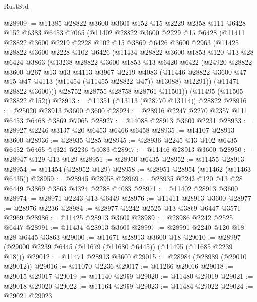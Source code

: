 \begin{lexlean}{RustStd}
\begin{coremodule}
@28909 := @11385
    @28822
    @3600
    @3600
    @152
    @15
    @2229
    @2358
    @111
    @6428
    @152
    @6383
    @6453
    @7065
    (@11402
      @28822
      @3600
      @2229
      @15
      @6428
      (@11411
        @28822
        @3600
        @2219
        @2228
        @102
        @15
        @3869
        @6426
        @3600
        @2963
        (@11425
          @28822
          @3600
          @2228
          @102
          @6426
          (@11434
            @28822
            @3600
            @1853
            @120
            @13
            @28
            @6424
            @3863
            (@13238
              @28822
              @3600
              @1853
              @13
              @6420
              @6422
              (@24920
                @28822
                @3600
                @267
                @13
                @13
                @4113
                @3967
                @2219
                @4083
                (@11446 @28822 @3600 @47 @15 @47 @4113 (@11454 (@11455 @28822 @47)) @13088)
                @12291))
            (@11471 @28822 @3600)))
        @28752
        @28755
        @28758
        @28761
        @11501))
    (@11495 (@11505 @28822 @152))
@28913 := @11351 (@13113 (@28770 @13114)) @28822
@28916 := @25020 @28913 @3600 @3600
@28924 := @28916 @2247 @2270 @2357 @111 @6453 @6468 @3869 @7065
@28927 := @14088 @28913 @3600 @2231
@28933 := @28927 @2246 @3137 @20 @6453 @6466 @6458
@28935 := @14107 @28913 @3600
@28936 := @28935 @285
@28945 := @28936 @2245 @13 @102 @6435 @6452 @6465 @4324 @2236 @4083
@28947 := @11446 @28913 @3600
@28950 := @28947 @129 @13 @129
@28951 := @28950 @6435
@28952 := @11455 @28913
@28954 := @11454 (@28952 @129)
@28958 := @28951 @28954 (@11462 (@11463 @6435))
@28959 := @28945 @28958
@28969 := @28935 @2243 @120 @13 @28 @6449 @3869 @3863 @4324 @2288 @4083
@28971 := @11402 @28913 @3600
@28974 := @28971 @2243 @13 @6449
@28976 := @11411 @28913 @3600
@28977 := @28976 @2236
@28984 := @28977 @2242 @2525 @13 @3869 @6447 @3571 @2969
@28986 := @11425 @28913 @3600
@28989 := @28986 @2242 @2525 @6447
@28991 := @11434 @28913 @3600
@28997 := @28991 @2240 @120 @18 @28 @6445 @3863
@29000 := @11671 @28913 @3600 @18
@29010 := @28997 (@29000 @2239 @6445 (@11679 (@11680 @6445)) (@11495 (@11685 @2239 @18)))
@29012 := @11471 @28913 @3600
@29015 := @28984 (@28989 (@29010 @29012))
@29016 := @11070 @2236
@29017 := @11266 @29016
@29018 := @29015 @29017
@29019 := @11140 @2969
@29020 := @11480 @29019
@29021 := @29018 @29020
@29022 := @11164 @2969
@29023 := @11484 @29022
@29024 := @29021 @29023

\end{coremodule}
\end{lexlean}
